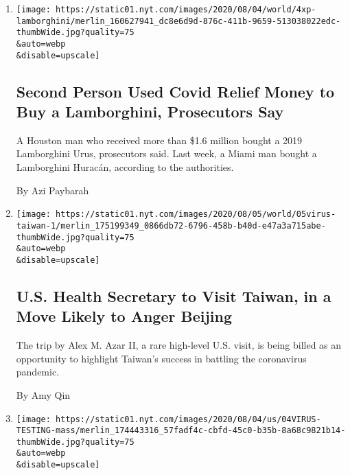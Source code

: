 \begin{enumerate}
\def\labelenumi{\arabic{enumi}.}
\item
  \href{/2020/08/04/us/lamborghini-coronavirus-stimulus.html}{}

  \texttt{[image: https://static01.nyt.com/images/2020/08/04/world/4xp-lamborghini/merlin\_160627941\_dc8e6d9d-876c-411b-9659-513038022edc-thumbWide.jpg?quality=75\\\&auto=webp\\\&disable=upscale]}

  \hypertarget{second-person-used-covid-relief-money-to-buy-a-lamborghini-prosecutors-say}{%
  \subsection{Second Person Used Covid Relief Money to Buy a
  Lamborghini, Prosecutors
  Say}\label{second-person-used-covid-relief-money-to-buy-a-lamborghini-prosecutors-say}}

  A Houston man who received more than \$1.6 million bought a 2019
  Lamborghini Urus, prosecutors said. Last week, a Miami man bought a
  Lamborghini Huracán, according to the authorities.

  By Azi Paybarah
\item
  \href{/2020/08/04/world/asia/taiwan-azar-beijing-coronavirus.html}{}

  \texttt{[image: https://static01.nyt.com/images/2020/08/05/world/05virus-taiwan-1/merlin\_175199349\_0866db72-6796-458b-b40d-e47a3a715abe-thumbWide.jpg?quality=75\\\&auto=webp\\\&disable=upscale]}

  \hypertarget{us-health-secretary-to-visit-taiwan-in-a-move-likely-to-anger-beijing}{%
  \subsection{U.S. Health Secretary to Visit Taiwan, in a Move Likely to
  Anger
  Beijing}\label{us-health-secretary-to-visit-taiwan-in-a-move-likely-to-anger-beijing}}

  The trip by Alex M. Azar II, a rare high-level U.S. visit, is being
  billed as an opportunity to highlight Taiwan's success in battling the
  coronavirus pandemic.

  By Amy Qin
\item
  \href{/2020/08/04/us/virus-testing-delays.html}{}

  \texttt{[image: https://static01.nyt.com/images/2020/08/04/us/04VIRUS-TESTING-mass/merlin\_174443316\_57fadf4c-cbfd-45c0-b35b-8a68c9821b14-thumbWide.jpg?quality=75\\\&auto=webp\\\&disable=upscale]}


\end{enumerate}
